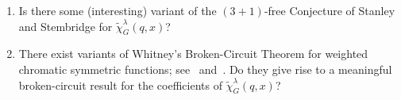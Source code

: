 \documentclass[11pt]{amsart}
\begin{document}
\begin{enumerate}
\item[(4)] Is there some (interesting) variant of the $(3+1)$-free Conjecture of Stanley and Stembridge \cite{StanleyStembridge} for $\widetilde{\chi}^\lambda_G(q,x)$?
\item[(5)] There exist variants of Whitney's Broken-Circuit Theorem for weighted chromatic symmetric functions; see~\cite[Lemma~3]{crewspirkl} and~\cite[Theorem~6.8]{grinberg}.
Do they give rise to a meaningful broken-circuit result for the coefficients of $\widetilde{\chi}^\lambda_G(q,x)$? 
\end{enumerate}





\setlength{\parskip}{0cm} 
\end{document}

